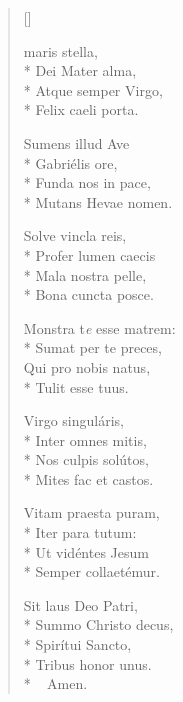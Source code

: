 \newHymn


\settowidth{\versewidth}{Ave maris stella..}

\pointtrans

\begin{multicols}{2}
\begin{verse}[\versewidth]

 maris stella, \\*
Dei Mater alma,   \\*      
Atque semper Virgo, \\*    
Felix caeli porta.      

Sumens illud Ave        \\*
Gabriélis ore,          \\*
Funda nos in pace,      \\*
Mutans Hevae nomen.     

Solve vincla reis,     \\*
Profer lumen caecis     \\*
Mala nostra pelle,      \\*
Bona cuncta posce.      

Monstra t\textit{e} esse matrem: \\*
Sumat per te preces,    \\
Qui pro nobis natus,    \\*
Tulit esse tuus.        
                 

Virgo singuláris,       \\*
Inter omnes mitis,      \\*
Nos culpis solútos,     \\*
Mites fac et castos.    

Vitam praesta puram,    \\*
Iter para tutum:        \\*
Ut vidéntes Jesum       \\*
Semper collaetémur.     

Sit laus Deo Patri,     \\*
Summo Christo decus,    \\*
Spirítui Sancto,        \\*
Tribus honor unus.\\*
 ~ \quad Amen.

\end{verse}
\end{multicols}


